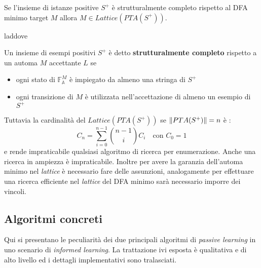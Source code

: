 \begin{teorema}
Se l'insieme di istanze positive $S^{+}$ è strutturalmente completo rispetto al \ac{DFA} minimo target $M$ allora $M \in Lattice(PTA(S^{+}))$. 
\end{teorema}
laddove
\begin{definizione}
\label{def:strcom}
Un insieme di esempi positivi $S^{+}$ è detto \textbf{strutturalmente completo} rispetto a un automa $M$ accettante $L$ se
\begin{itemize}
\item ogni stato di $\mathbb{F}_{\mathbb{A}}^{M}$ è impiegato da almeno una stringa di $S^{+}$
\item ogni transizione di $M$ è utilizzata nell'accettazione di almeno un esempio di $S^{+}$
\end{itemize}
\end{definizione}

Tuttavia la cardinalità del $Lattice(PTA(S^{+}))$ se $\lVert PTA(S^{+})\rVert = n$ è :
\begin{equation*}
C_{n} = \sum_{i=0}^{n-1}\binom{n-1}{i}C_{i}  \quad \text{con } C_{0}=1
\end{equation*}
e rende impraticabile qualsiasi algoritmo di ricerca per enumerazione. Anche una ricerca in ampiezza è impraticabile. Inoltre  per avere la garanzia dell'automa minimo nel \textit{lattice} è necessario fare delle assunzioni, analogamente per effettuare una ricerca efficiente nel \textit{lattice} del \ac{DFA} minimo sarà necessario imporre dei vincoli.

\subsection{Algoritmi concreti} 
\label{sub:algcon}
 Qui si presentano le peculiarità dei due principali algoritmi di \textit{passive learning} in uno scenario di \textit{informed learning}. La trattazione ivi esposta è qualitativa e di alto livello ed i dettagli implementativi sono tralasciati.
